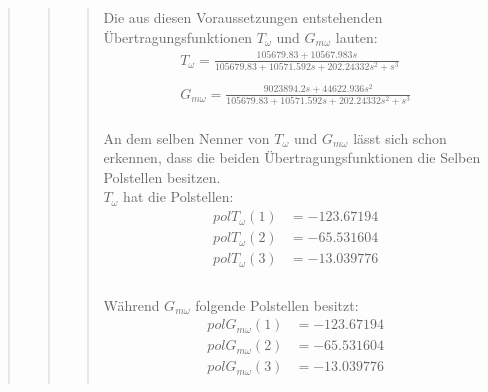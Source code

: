 \begin{quote}
\begin{quote}
\begin{quote}
    
            Die aus diesen Voraussetzungen entstehenden Übertragungsfunktionen $T_\omega$ und $G_{m\omega}$ lauten:\\
            
            \begin{equation*}
            	\begin{split}
            		T_\omega = \frac{105679.83 + 10567.983s}{105679.83 + 10571.592s + 202.24332s^2 + s^3}\\ \\
            		G_{m\omega} = \frac{9023894.2s + 44622.936s^2}{105679.83 + 10571.592s + 202.24332s^2 + s^3}
            	\end{split}
            \end{equation*}\\
            
            An dem selben Nenner von $T_\omega$ und $G_{m\omega}$ lässt sich schon erkennen, dass die beiden
            Übertragungsfunktionen die Selben Polstellen besitzen.\\
            
            $T_\omega$ hat die Polstellen:\\
            \begin{equation*}
                \begin{split}
                    pol T_\omega (1) &= - 123.67194\\
                    pol T_\omega (2) &= - 65.531604\\
                    pol T_\omega (3) &= - 13.039776\\                   
                \end{split}
            \end{equation*}\\
            
            Während $G_{m\omega}$ folgende Polstellen besitzt:\\
            
            \begin{equation*}
                \begin{split}
                    pol G_{m\omega} (1) &= - 123.67194\\
                    pol G_{m\omega} (2) &= - 65.531604\\                
                    pol G_{m\omega} (3) &= - 13.039776\\              
                \end{split}
            \end{equation*}
            

\end{quote}
\end{quote}
\end{quote}
